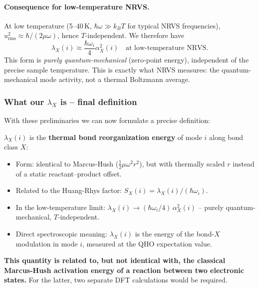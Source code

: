 \documentclass[11pt,a4paper,twoside]{article}
\theoremstyle{remark}
\begin{document}
\paragraph{Consequence for low-temperature NRVS.}
At low temperature (5--40\,K, $\hbar\omega \gg k_BT$ for typical
NRVS frequencies), $u_\text{rms}^2 \approx \hbar/(2\mu\omega)$,
hence $T$-independent. We therefore have
\begin{equation}
  \lambda_X(i) \approx \frac{\hbar\omega_i}{4}\alpha_X^2(i)
  \quad\text{at low-temperature NRVS}.
\end{equation}
This form is \emph{purely quantum-mechanical} (zero-point energy),
independent of the precise sample temperature. This is exactly what
NRVS measures: the quantum-mechanical mode activity, not a thermal
Boltzmann average.

\subsubsection*{What our $\lambda_X$ is -- final definition}

With these preliminaries we can now formulate a precise definition:

\begin{tcolorbox}[colback=accent!5,colframe=accent,
  title={What $\lambda_X$ is in \texttt{modenanalyse\_2fe2s}}]
$\lambda_X(i)$ is the \textbf{thermal bond reorganization energy}
of mode $i$ along bond class $X$:
\begin{itemize}\setlength{\itemsep}{0pt}
  \item Form: identical to Marcus-Hush
        ($\tfrac{1}{2}\mu\omega^2 r^2$), but with thermally scaled
        $r$ instead of a static reactant--product offset.
  \item Related to the Huang-Rhys factor: $S_X(i) =
        \lambda_X(i)/(\hbar\omega_i)$.
  \item In the low-temperature limit:
        $\lambda_X(i) \to (\hbar\omega_i/4)\,\alpha_X^2(i)$
        -- purely quantum-mechanical, $T$-independent.
  \item Direct spectroscopic meaning: $\lambda_X(i)$ is the energy
        of the bond-$X$ modulation in mode $i$, measured at the
        QHO expectation value.
\end{itemize}

\textbf{This quantity is related to, but not identical with, the
classical Marcus-Hush activation energy of a reaction between two
electronic states.} For the latter, two separate DFT calculations
would be required.
\end{tcolorbox}
\end{document}
